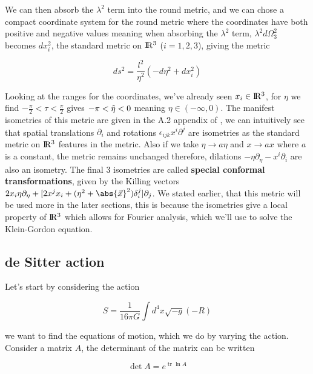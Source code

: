 \documentclass[a4paper,11pt]{article}
\numberwithin{equation}{section}
\numberwithin{figure}{section}
\begin{document}
\begin{large}
We can then absorb the $\lambda^2$ term into the round metric, and we can chose a compact coordinate system for the round metric where the coordinates have both positive and negative values meaning when absorbing the $\lambda^2$ term, $\lambda^2d\Omega^2_3$ becomes $dx^2_i$, the standard metric on $\rm I\!R^3$ ($i=1,2,3$), giving the metric

\begin{equation}
\label{planar metric}
    ds^2=\frac{l^2}{\eta^2}(-d\eta^2+dx_i^2)
\end{equation}

Looking at the ranges for the coordinates, we've already seen $x_i \in \rm I\!R^3$, for $\eta$ we find $-\frac{\pi}{2}<\tau<\frac{\pi}{2}$ gives $-\pi<\Tilde{\eta}<0$ meaning $\eta \in (-\infty,0)$. The manifest isometries of this metric are given in the A.2 appendix of \cite{_eng_r_2020}, we can intuitively see that spatial translations $\partial_i$ and rotations $\epsilon_{ijk}x^i\partial^j$ are isometries as the standard metric on $\rm I\!R^3$ features in the metric. Also if we take $\eta \rightarrow a\eta$ and $x \rightarrow ax$ where $a$ is a constant, the metric remains unchanged therefore, dilations $-\eta\partial_{\eta}-x^i\partial_i$ are also an isometry. The final 3 isometries are called \textbf{special conformal transformations}, given by the Killing vectors $2x_i\eta\partial_{\eta}+[2x^jx_i+(\eta^2+\abs{\Vec{x}}^2)\delta^j_i]\partial_j$. We stated earlier, that this metric will be used more in the later sections, this is because the isometries give a local property of $\rm I\!R^3$ which allows for Fourier analysis, which we'll use to solve the Klein-Gordon equation. 


\subsection{de Sitter action}

Let's start by considering the action

\begin{equation}
\label{de Sitter action}
    S=\frac{1}{16\pi G} \int d^4x \sqrt{-g} (-R)
\end{equation}

we want to find the equations of motion, which we do by varying the action. Consider a matrix $A$, the determinant of the matrix can be written

\begin{equation}
\label{det A}   
    \det A=e^{\operatorname{tr}\ln A}
\end{equation}


\end{large}
\end{document}
